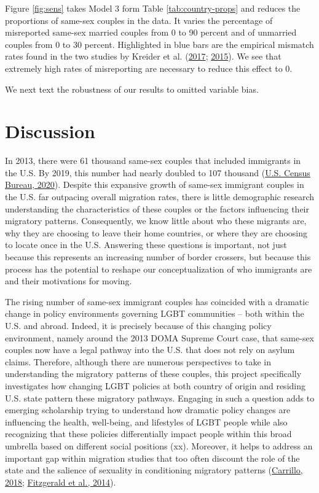 \documentclass[
  11pt,
]{article}
\begin{document}
Figure \ref{fig:sens} takes Model 3 form Table \ref{tab:country-props} and reduces the proportions of same-sex couples in the data. It varies the percentage of misreported same-sex married couples from 0 to 90 percent and of unmarried couples from 0 to 30 percent. Highlighted in blue bars are the empirical mismatch rates found in the two studies by Kreider et al. (\protect\hyperlink{ref-kreider_2017}{2017}; \protect\hyperlink{ref-kreider_2015}{2015}). We see that extremely high rates of misreporting are necessary to reduce this effect to 0.

We next text the robustness of our results to omitted variable bias.

\hypertarget{discussion}{%
\section{Discussion}\label{discussion}}

In 2013, there were 61 thousand same-sex couples that included immigrants in the U.S. By 2019, this number had nearly doubled to 107 thousand (\protect\hyperlink{ref-u.s.censusbureau_2020}{U.S. Census Bureau, 2020}). Despite this expansive growth of same-sex immigrant couples in the U.S. far outpacing overall migration rates, there is little demographic research understanding the characteristics of these couples or the factors influencing their migratory patterns. Consequently, we know little about who these migrants are, why they are choosing to leave their home countries, or where they are choosing to locate once in the U.S. Answering these questions is important, not just because this represents an increasing number of border crossers, but because this process has the potential to reshape our conceptualization of who immigrants are and their motivations for moving.

The rising number of same-sex immigrant couples has coincided with a dramatic change in policy environments governing LGBT communities -- both within the U.S. and abroad. Indeed, it is precisely because of this changing policy environment, namely around the 2013 DOMA Supreme Court case, that same-sex couples now have a legal pathway into the U.S. that does not rely on asylum claims. Therefore, although there are numerous perspectives to take in understanding the migratory patterns of these couples, this project specifically investigates how changing LGBT policies at both country of origin and residing U.S. state pattern these migratory pathways. Engaging in such a question adds to emerging scholarship trying to understand how dramatic policy changes are influencing the health, well-being, and lifestyles of LGBT people while also recognizing that these policies differentially impact people within this broad umbrella based on different social positions (xx). Moreover, it helps to address an important gap within migration studies that too often discount the role of the state and the salience of sexuality in conditioning migratory patterns (\protect\hyperlink{ref-carrillo_2018}{Carrillo, 2018}; \protect\hyperlink{ref-fitzgerald_2014}{Fitzgerald et al., 2014}).
\end{document}
